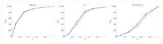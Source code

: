 \documentclass[a4paper]{report}
\newcommand{\wratio}{0.195}
\begin{document}
\includegraphics[width=\wratio\textwidth]{influence/EMAIL/fs_email}\hfill
\includegraphics[width=\wratio\textwidth]{influence/E_R/fs_e_r}\hfill
\includegraphics[width=\wratio\textwidth]{influence/EUROROAD/fs_euroroad}\hfill
\end{document}

